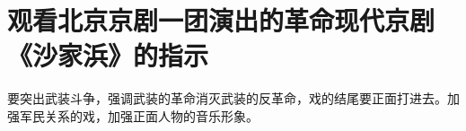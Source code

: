 \section[观看北京京剧一团演出的革命现代京剧《沙家浜》的指示（一九六四年七月）]{观看北京京剧一团演出的革命现代京剧《沙家浜》的指示}


要突出武装斗争，强调武装的革命消灭武装的反革命，戏的结尾要正面打进去。加强军民关系的戏，加强正面人物的音乐形象。



